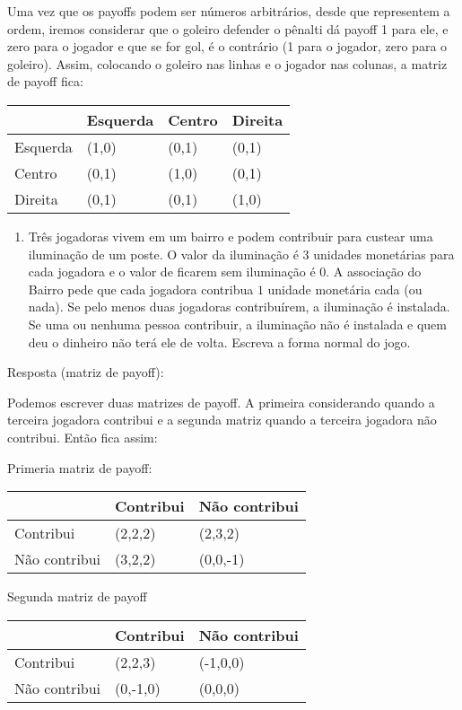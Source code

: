 \documentclass[
]{article}
\providecommand{\tightlist}{%
  \setlength{\itemsep}{0pt}\setlength{\parskip}{0pt}}
\begin{document}
Uma vez que os payoffs podem ser números arbitrários, desde que
representem a ordem, iremos considerar que o goleiro defender o pênalti
dá payoff 1 para ele, e zero para o jogador e que se for gol, é o
contrário (1 para o jogador, zero para o goleiro). Assim, colocando o
goleiro nas linhas e o jogador nas colunas, a matriz de payoff fica:

\begin{longtable}[]{@{}llll@{}}
\toprule
& Esquerda & Centro & Direita\tabularnewline
\midrule
\endhead
Esquerda & (1,0) & (0,1) & (0,1)\tabularnewline
Centro & (0,1) & (1,0) & (0,1)\tabularnewline
Direita & (0,1) & (0,1) & (1,0)\tabularnewline
\bottomrule
\end{longtable}

\begin{enumerate}
\def\labelenumi{\arabic{enumi}.}
\setcounter{enumi}{6}
\tightlist
\item
  Três jogadoras vivem em um bairro e podem contribuir para custear uma
  iluminação de um poste. O valor da iluminação é \(3\) unidades
  monetárias para cada jogadora e o valor de ficarem sem iluminação é
  \(0\). A associação do Bairro pede que cada jogadora contribua \(1\)
  unidade monetária cada (ou nada). Se pelo menos duas jogadoras
  contribuírem, a iluminação é instalada. Se uma ou nenhuma pessoa
  contribuir, a iluminação não é instalada e quem deu o dinheiro não
  terá ele de volta. Escreva a forma normal do jogo.
\end{enumerate}

Resposta (matriz de payoff):

Podemos escrever duas matrizes de payoff. A primeira considerando quando
a terceira jogadora contribui e a segunda matriz quando a terceira
jogadora não contribui. Então fica assim:

Primeria matriz de payoff:

\begin{longtable}[]{@{}lll@{}}
\toprule
& Contribui & Não contribui\tabularnewline
\midrule
\endhead
Contribui & (2,2,2) & (2,3,2)\tabularnewline
Não contribui & (3,2,2) & (0,0,-1)\tabularnewline
\bottomrule
\end{longtable}

Segunda matriz de payoff

\begin{longtable}[]{@{}lll@{}}
\toprule
& Contribui & Não contribui\tabularnewline
\midrule
\endhead
Contribui & (2,2,3) & (-1,0,0)\tabularnewline
Não contribui & (0,-1,0) & (0,0,0)\tabularnewline
\bottomrule
\end{longtable}
\end{document}
